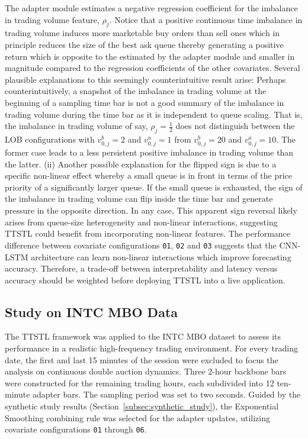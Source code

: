 \documentclass[10pt,a4paper,oneside]{article}
\providecommand{\DIFdelbegin}{} %
\newcommand{\DIFscaledelfig}{0.5}
\newlength{\DIFdelgraphicswidth} %
\newlength{\DIFdelgraphicsheight} %
\newcommand{\DIFdelincludegraphics}[2][]{%
\sbox{\DIFdelgraphicsbox}{\DIFOincludegraphics[#1]{#2}}%
\settoboxwidth{\DIFdelgraphicswidth}{\DIFdelgraphicsbox} %
\settoboxtotalheight{\DIFdelgraphicsheight}{\DIFdelgraphicsbox} %
\scalebox{\DIFscaledelfig}{%
\parbox[b]{\DIFdelgraphicswidth}{\usebox{\DIFdelgraphicsbox}\\[-\baselineskip] \rule{\DIFdelgraphicswidth}{0em}}\llap{\resizebox{\DIFdelgraphicswidth}{\DIFdelgraphicsheight}{%
\setlength{\unitlength}{\DIFdelgraphicswidth}%
\begin{picture}(1,1)%
\thicklines\linethickness{2pt} %
{\color[rgb]{1,0,0}\put(0,0){\framebox(1,1){}}}%
{\color[rgb]{1,0,0}\put(0,0){\line( 1,1){1}}}%
{\color[rgb]{1,0,0}\put(0,1){\line(1,-1){1}}}%
\end{picture}%
}\hspace*{3pt}}} %
} %
\DeclareRobustCommand{\DIFdelbegin}{\DIFOdelbegin \let\includegraphics\DIFdelincludegraphics} %
\begin{document}
The adapter module estimates a negative regression coefficient for the imbalance in trading volume feature, $\rho_j$. Notice that a positive continuous time imbalance in trading volume induces more marketable buy orders than sell ones which in principle reduces the size of the best ask queue thereby generating a positive return which is opposite to the estimated by the adapter module and smaller in magnitude compared to the regression coefficients of the other covariates. Several plausible explanations to this seemingly counterintuitive result arise: Perhaps counterintuitively, a snapshot of the imbalance in trading volume at the beginning of a sampling time bar is not a good summary of the imbalance in trading volume during the time bar as it is independent to queue scaling. That is, the imbalance in trading volume of say, $\rho_j = \frac{1}{2}$ does not distinguish between the LOB configurations with $v^b_{0,j} = 2$ and $v^a_{0, j} = 1$ from $v^b_{0,j} = 20$ and $v^a_{0, j} = 10$. The former case leads to a less persistent positive imbalance in trading volume than the latter. (ii) Another possible explanation for the flipped sign is due to a specific non-linear effect whereby a small queue is in front in terms of the price priority of a significantly larger queue. If the small queue is exhausted, the sign of the imbalance in trading volume can flip inside the time bar and generate pressure in the opposite direction. In any case, This apparent sign reversal likely arises from queue-size heterogeneity and non-linear interactions, suggesting TTSTL could benefit from incorporating non-linear features. The performance difference between covariate configurations  \verb|01|, \verb|02| and \verb|03| suggests that the CNN-LSTM architecture can learn non-linear interactions which improve forecasting accuracy. Therefore, a trade-off between interpretability and latency versus accuracy should be weighted before deploying TTSTL into a live application.

\subsection{Study on INTC MBO Data}
\label{subsec:results_intc}

The TTSTL framework was applied to the INTC MBO dataset to assess its performance in a realistic high-frequency trading environment. For every trading date, the first and last 15 minutes of the session were excluded to focus the analysis on continuous double auction dynamics. Three 2-hour backbone bars were constructed for the remaining trading hours, each subdivided into 12 ten-minute adapter bars. The sampling period was set to two seconds. Guided by the synthetic study results (Section~\ref{subsec:synthetic_study}), the Exponential Smoothing combining rule was selected for the adapter updates, utilizing covariate configurations \texttt{01} through \texttt{06}. \DIFdelbegin %
\end{document}
